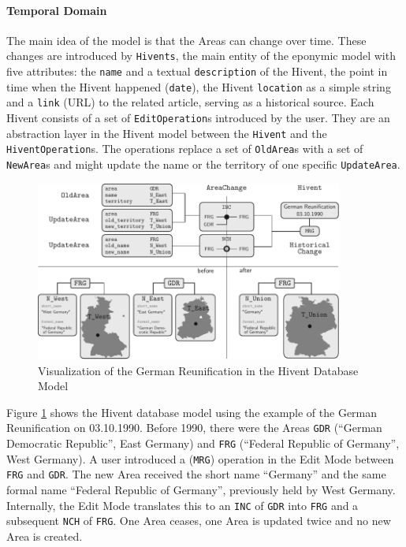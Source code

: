 
\paragraph{Temporal Domain} %
\label{par:temporal_domain}

The main idea of the model is that the Areas can change over time. These changes are introduced by \texttt{Hivents}, the main entity of the eponymic model with five attributes: the \texttt{name} and a textual \texttt{description} of the Hivent, the point in time when the Hivent happened (\texttt{date}), the Hivent \texttt{location} as a simple string and a \texttt{link} (URL) to the related article, serving as a historical source.
Each Hivent consists of a set of \texttt{EditOperation}s introduced by the user.
They are an abstraction layer in the Hivent model between the \texttt{Hivent} and the \texttt{HiventOperation}s.
The operations replace a set of \texttt{OldArea}s with a set of \texttt{NewArea}s and might update the name or the territory of one specific \texttt{UpdateArea}.



\begin{figure}[ht]
  \vspace{1.5em}
  \includegraphics[width=0.9\textwidth]{graphics/development/implementation/example_reunification}
  \caption{Visualization of the German Reunification in the Hivent Database Model}
  \label{fig:database_example_reunification}
\end{figure}

Figure \ref{fig:database_example_reunification} shows the Hivent database model using the example of the German Reunification on 03.10.1990. Before 1990, there were the Areas \texttt{GDR} (``German Democratic Republic'', East Germany) and \texttt{FRG} (``Federal Republic of Germany'', West Germany). A user introduced a (\texttt{MRG}) operation in the Edit Mode between \texttt{FRG} and \texttt{GDR}. The new Area received the short name ``Germany'' and the same formal name ``Federal Republic of Germany'', previously held by West Germany. Internally, the Edit Mode translates this to an \texttt{INC} of \texttt{GDR} into \texttt{FRG} and a subsequent \texttt{NCH} of \texttt{FRG}. One Area ceases, one Area is updated twice and no new Area is created.

